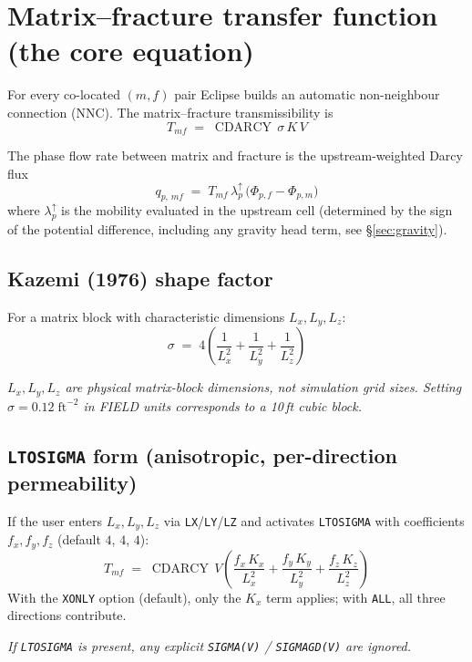 \documentclass[11pt,a4paper]{article}
\newcommand{\kw}[1]{\texttt{#1}}
\newcommand{\note}[1]{\par\smallskip\textit{#1}\par\smallskip}
\DeclareMathOperator{\CDARCY}{CDARCY}
\begin{document}
\section{Matrix--fracture transfer function (the core equation)}

For every co-located $(m,f)$ pair Eclipse builds an automatic non-neighbour connection (NNC).
The matrix--fracture transmissibility is
\begin{equation}
T_{mf} \;=\; \CDARCY\,\sigma\,K\,V
\label{eq:Tmf}
\tag{TD 2.54}
\end{equation}

The phase flow rate between matrix and fracture is the upstream-weighted Darcy flux
\begin{equation}
q_{p,\,mf} \;=\; T_{mf}\,\lambda_{p}^{\uparrow}\,\bigl(\Phi_{p,f} - \Phi_{p,m}\bigr)
\label{eq:qp}
\end{equation}
where $\lambda_{p}^{\uparrow}$ is the mobility evaluated in the upstream cell (determined by the
sign of the potential difference, including any gravity head term, see §\ref{sec:gravity}).

\subsection*{Kazemi (1976) shape factor}
For a matrix block with characteristic dimensions $L_x,L_y,L_z$:
\begin{equation}
\sigma \;=\; 4\left(\frac{1}{L_x^{2}} + \frac{1}{L_y^{2}} + \frac{1}{L_z^{2}}\right)
\label{eq:sigma-kazemi}
\tag{TD 2.55 ; RM 3.172}
\end{equation}
\note{$L_x,L_y,L_z$ are \emph{physical} matrix-block dimensions, not simulation grid sizes.
Setting $\sigma = 0.12\;\text{ft}^{-2}$ in FIELD units corresponds to a 10\,ft cubic block.}

\subsection*{\kw{LTOSIGMA} form (anisotropic, per-direction permeability)}
If the user enters $L_x,L_y,L_z$ via \kw{LX}/\kw{LY}/\kw{LZ} and activates \kw{LTOSIGMA} with
coefficients $f_x,f_y,f_z$ (default $4$, $4$, $4$):
\begin{equation}
T_{mf} \;=\; \CDARCY\,V\left(
  \frac{f_x\,K_x}{L_x^{2}} + \frac{f_y\,K_y}{L_y^{2}} + \frac{f_z\,K_z}{L_z^{2}}
\right)
\label{eq:Tmf-lto}
\tag{TD 2.56 ; RM 3.116}
\end{equation}
With the \texttt{XONLY} option (default), only the $K_x$ term applies; with \texttt{ALL}, all three directions contribute.
\note{If \kw{LTOSIGMA} is present, any explicit \kw{SIGMA(V)} / \kw{SIGMAGD(V)} are \emph{ignored}.}
\end{document}

